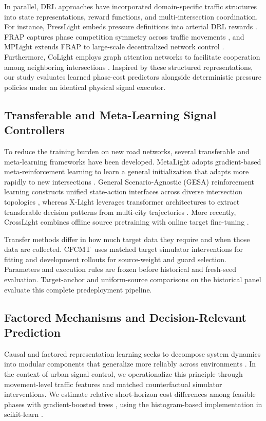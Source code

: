 \documentclass[letterpaper,journal]{IEEEtran}
\newcommand{\method}{CFCMT}
\begin{document}
In parallel, DRL approaches have incorporated domain-specific traffic structures into state representations, reward functions, and multi-intersection coordination. For instance, PressLight embeds pressure definitions into arterial DRL rewards \cite{wei2019presslight}. FRAP captures phase competition symmetry across traffic movements \cite{zheng2019frap}, and MPLight extends FRAP to large-scale decentralized network control \cite{chen2020thousandlights}. Furthermore, CoLight employs graph attention networks to facilitate cooperation among neighboring intersections \cite{wei2019colight}. Inspired by these structured representations, our study evaluates learned phase-cost predictors alongside deterministic pressure policies under an identical physical signal executor.

\subsection{Transferable and Meta-Learning Signal Controllers}
To reduce the training burden on new road networks, several transferable and meta-learning frameworks have been developed. MetaLight adopts gradient-based meta-reinforcement learning to learn a general initialization that adapts more rapidly to new intersections \cite{zang2020metalight}. General Scenario-Agnostic (GESA) reinforcement learning constructs unified state-action interfaces across diverse intersection topologies \cite{jiang2024gesa}, whereas X-Light leverages transformer architectures to extract transferable decision patterns from multi-city trajectories \cite{jiang2024xlight}. More recently, CrossLight combines offline source pretraining with online target fine-tuning \cite{sun2024crosslight}.

Transfer methods differ in how much target data they require and when those data are collected. \method\ uses matched target simulator interventions for fitting and development rollouts for source-weight and guard selection. Parameters and execution rules are frozen before historical and fresh-seed evaluation. Target-anchor and uniform-source comparisons on the historical panel evaluate this complete predeployment pipeline.

\subsection{Factored Mechanisms and Decision-Relevant Prediction}
Causal and factored representation learning seeks to decompose system dynamics into modular components that generalize more reliably across environments \cite{bengio2019meta,scholkopf2021causal,feng2022factored}. In the context of urban signal control, we operationalize this principle through movement-level traffic features and matched counterfactual simulator interventions. We estimate relative short-horizon cost differences among feasible phases with gradient-boosted trees \cite{friedman2001greedy}, using the histogram-based implementation in scikit-learn \cite{pedregosa2011scikit}.
\end{document}
